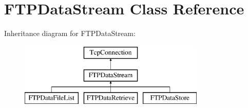 \hypertarget{class_f_t_p_data_stream}{}\section{F\+T\+P\+Data\+Stream Class Reference}
\label{class_f_t_p_data_stream}
Inheritance diagram for F\+T\+P\+Data\+Stream\+:\begin{figure}[H]
\begin{center}
\leavevmode
\includegraphics[height=3.000000cm]{class_f_t_p_data_stream}
\end{center}
\end{figure}
